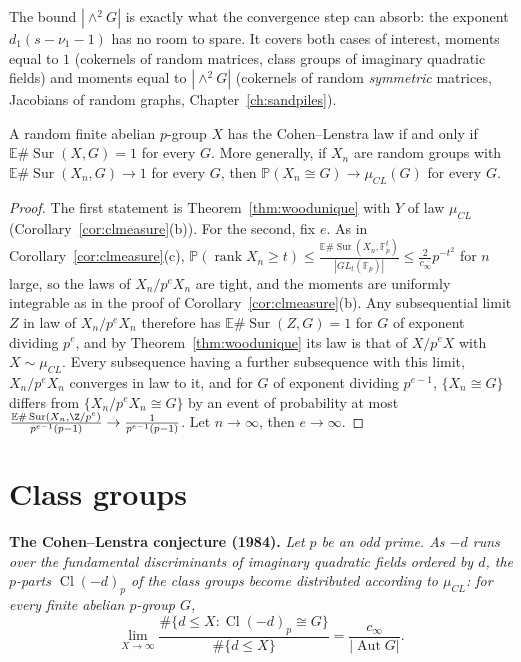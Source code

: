 The bound $|\wedge^2G|$ is exactly what the convergence step can absorb: the exponent $d_1(s-\nu_1-1)$ has no room to spare. It covers both cases of interest, moments equal to $1$ (cokernels of random matrices, class groups of imaginary quadratic fields) and moments equal to $|\wedge^2G|$ (cokernels of random \emph{symmetric} matrices, Jacobians of random graphs, Chapter~\ref{ch:sandpiles}).

\begin{corollary}\label{cor:clcharacterize}
A random finite abelian $p$-group $X$ has the Cohen--Lenstra law if and only if $\mathbb E\#\operatorname{Sur}(X,G)=1$ for every $G$. More generally, if $X_n$ are random groups with $\mathbb E\#\operatorname{Sur}(X_n,G)\to1$ for every $G$, then $\mathbb P(X_n\cong G)\to\mu_{CL}(G)$ for every $G$.
\end{corollary}
\begin{proof}
The first statement is Theorem~\ref{thm:woodunique} with $Y$ of law $\mu_{CL}$ (Corollary~\ref{cor:clmeasure}(b)). For the second, fix $e$. As in Corollary~\ref{cor:clmeasure}(c), $\mathbb P(\operatorname{rank}X_n\ge t)\le\frac{\mathbb E\#\operatorname{Sur}(X_n,\mathbb F_p^t)}{|GL_t(\mathbb F_p)|}\le\frac2{c_\infty}p^{-t^2}$ for $n$ large, so the laws of $X_n/p^eX_n$ are tight, and the moments are uniformly integrable as in the proof of Corollary~\ref{cor:clmeasure}(b). Any subsequential limit $Z$ in law of $X_n/p^eX_n$ therefore has $\mathbb E\#\operatorname{Sur}(Z,G)=1$ for $G$ of exponent dividing $p^e$, and by Theorem~\ref{thm:woodunique} its law is that of $X/p^eX$ with $X\sim\mu_{CL}$. Every subsequence having a further subsequence with this limit, $X_n/p^eX_n$ converges in law to it, and for $G$ of exponent dividing $p^{e-1}$, $\{X_n\cong G\}$ differs from $\{X_n/p^eX_n\cong G\}$ by an event of probability at most $\frac{\mathbb E\#\operatorname{Sur}(X_n,\Z/p^e)}{p^{e-1}(p-1)}\to\frac1{p^{e-1}(p-1)}$. Let $n\to\infty$, then $e\to\infty$.
\end{proof}

\section{Class groups}

\medskip\noindent\textbf{The Cohen--Lenstra conjecture (1984).} \emph{Let $p$ be an odd prime. As $-d$ runs over the fundamental discriminants of imaginary quadratic fields ordered by $d$, the $p$-parts $\operatorname{Cl}(-d)_p$ of the class groups become distributed according to $\mu_{CL}$: for every finite abelian $p$-group $G$,
\[
\lim_{X\to\infty}\frac{\#\{d\le X:\operatorname{Cl}(-d)_p\cong G\}}{\#\{d\le X\}}=\frac{c_\infty}{|\operatorname{Aut}G|}.
\]}

